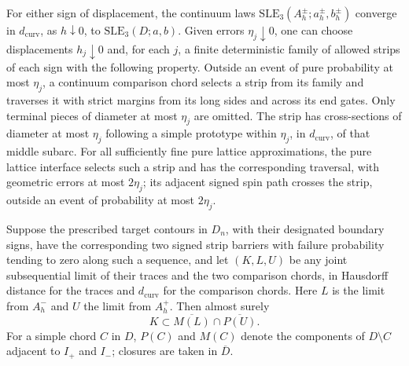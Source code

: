 \begin{lemma}
\label{curv:geometric-input}
For either sign of displacement, the continuum laws
$\mathrm{SLE}_3(A_h^\pm;a_h^\pm,b_h^\pm)$
converge in $d_{\mathrm{curv}}$, as $h\downarrow0$, to
$\mathrm{SLE}_3(D;a,b)$.  Given errors $\eta_j\downarrow0$, one can
choose displacements $h_j\downarrow0$ and, for each $j$, a finite
deterministic family of allowed strips of each sign with the following
property.  Outside an event of pure probability at most $\eta_j$, a
continuum comparison chord selects a strip from its family and traverses
it with strict margins from its long sides and across its end gates.
Only terminal pieces of diameter at most $\eta_j$ are omitted.  The
strip has cross-sections of diameter at most $\eta_j$ following a simple
prototype within $\eta_j$, in $d_{\mathrm{curv}}$, of that middle subarc.
For all sufficiently fine pure lattice approximations, the pure lattice
interface selects such a strip and has the corresponding traversal,
with geometric errors at most $2\eta_j$; its adjacent signed spin path
crosses the strip, outside an event of probability at most $2\eta_j$.

Suppose the prescribed target contours in $D_n$, with their designated
boundary signs, have the corresponding two signed strip barriers with
failure probability tending to zero along such a sequence, and let
$(K,L,U)$ be any joint subsequential limit of their traces and the two
comparison chords, in Hausdorff distance for the traces and
$d_{\mathrm{curv}}$ for the comparison chords.  Here $L$ is the limit
from $A_h^-$ and $U$ the limit from $A_h^+$.  Then almost surely
\begin{equation}
 K\subset\overline{M(L)}\cap\overline{P(U)}.
 \label{curv:forbidden-sides}
\end{equation}
For a simple chord $C$ in $D$, $P(C)$ and $M(C)$ denote the components
of $D\setminus C$ adjacent to $I_+$ and $I_-$; closures are taken in
$\overline D$.
\end{lemma}

